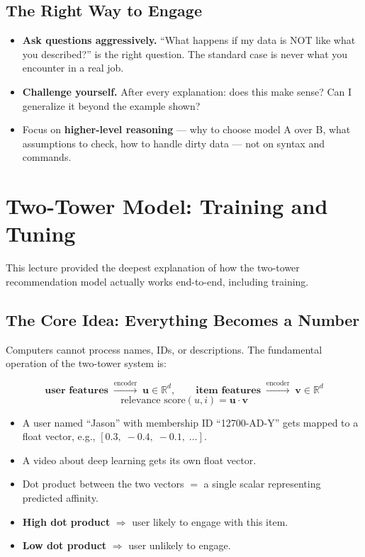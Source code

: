 \documentclass[11pt]{article}
\begin{document}
\subsection{The Right Way to Engage}
\begin{itemize}
    \item \textbf{Ask questions aggressively.} ``What happens if my data
      is NOT like what you described?'' is the right question. The
      standard case is never what you encounter in a real job.
    \item \textbf{Challenge yourself.} After every explanation: does this
      make sense? Can I generalize it beyond the example shown?
    \item Focus on \textbf{higher-level reasoning} --- why to choose model
      A over B, what assumptions to check, how to handle dirty data ---
      not on syntax and commands.
\end{itemize}


\newpage
\section{Two-Tower Model: Training and Tuning}

This lecture provided the deepest explanation of how the two-tower
recommendation model actually works end-to-end, including training.

\subsection{The Core Idea: Everything Becomes a Number}
Computers cannot process names, IDs, or descriptions. The fundamental
operation of the two-tower system is:

\[
\textbf{user features} \;\xrightarrow{\text{encoder}}\; \mathbf{u} \in
\mathbb{R}^d, \qquad
\textbf{item features} \;\xrightarrow{\text{encoder}}\; \mathbf{v} \in
\mathbb{R}^d
\]
\[
\text{relevance score}(u, i) = \mathbf{u} \cdot \mathbf{v}
\]

\begin{itemize}
    \item A user named ``Jason'' with membership ID ``12700-AD-Y'' gets
      mapped to a float vector, e.g., $[0.3,\; -0.4,\; -0.1,\; \ldots]$.
    \item A video about deep learning gets its own float vector.
    \item Dot product between the two vectors $=$ a single scalar
      representing predicted affinity.
    \item \textbf{High dot product} $\Rightarrow$ user likely to engage
      with this item.
    \item \textbf{Low dot product} $\Rightarrow$ user unlikely to engage.
\end{itemize}
\end{document}
